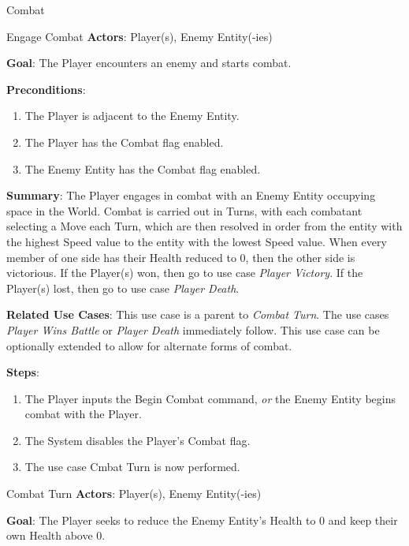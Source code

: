 \documentclass[12pt]{report}
\begin{document}
  \begin{section}{Combat}
    \begin{subsection}{Engage Combat}
      \textbf{Actors}:
      Player(s), Enemy Entity(-ies)

      \textbf{Goal}:
      The Player encounters an enemy and starts combat.

      \textbf{Preconditions}:
      \begin{enumerate}
        \item The Player is adjacent to the Enemy Entity.
        \item The Player has the Combat flag enabled.
        \item The Enemy Entity has the Combat flag enabled.
      \end{enumerate}

      \textbf{Summary}:
      The Player engages in combat with an Enemy Entity occupying space in the
      World. Combat is carried out in Turns, with each combatant selecting a Move
      each Turn, which are then resolved in order from the entity with the
      highest Speed value to the entity with the lowest Speed value. When every
      member of one side has their Health reduced to 0, then the other side is
      victorious. If the Player(s) won, then go to use case \textit{Player
      Victory}. If the Player(s) lost, then go to use case \textit{Player Death}.

      \textbf{Related Use Cases}:
      This use case is a parent to \textit{Combat Turn}. The use cases
      \textit{Player Wins Battle} or \textit{Player Death} immediately follow. This
      use case can be optionally extended to allow for alternate forms of combat.

      \textbf{Steps}:
      \begin{enumerate}
        \item The Player inputs the Begin Combat command, \textit{or} the Enemy
        Entity begins combat with the Player.
        \item The System disables the Player's Combat flag.
        \item The use case Cmbat Turn is now performed.
      \end{enumerate}
    \end{subsection}


    \begin{subsection}{Combat Turn}
      \textbf{Actors}:
      Player(s), Enemy Entity(-ies)

      \textbf{Goal}:
      The Player seeks to reduce the Enemy Entity's Health to 0 and keep their
      own Health above 0.


\end{subsection}
\end{section}
\end{document}
